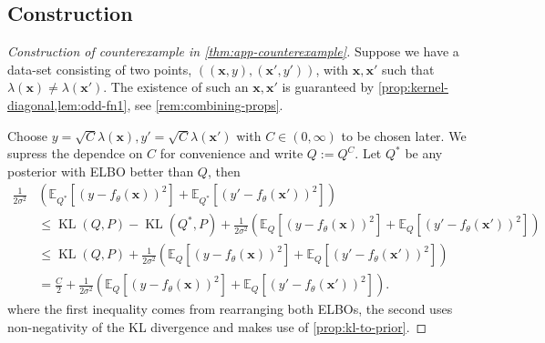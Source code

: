 \documentclass[twoside]{article}
\newcommand{\vx}{\mathbf{x}}
\newcommand{\E}{\mathbb{E}}
\renewcommand{\P}{\mathbb{P}}
\newcommand{\Q}{\mathbb{Q}}
\renewcommand{\Q}{\ensuremath{Q}}
\renewcommand{\P}{\ensuremath{P}}
\newcommand{\KL}{\operatorname{KL}}
\theoremstyle{theoremstyle}
\begin{document}
\subsection{Construction}

\begin{proof}[Construction of counterexample in \cref{thm:app-counterexample}]
Suppose we have a data-set consisting of two points, $((\vx,y), (\vx',y'))$, with $\vx, \vx'$ such that $\lambda(\vx) \neq \lambda(\vx')$. The existence of such an $\vx, \vx'$ is guaranteed by \cref{prop:kernel-diagonal,lem:odd-fn1}, see \cref{rem:combining-props}.

Choose $y=\sqrt{C}\lambda(\vx),y'=\sqrt{C}\lambda(\vx')$ with $C\in (0,\infty)$ to be chosen later. We supress the dependce on $C$ for convenience and write $\Q:=\Q^{C}$. Let $\Q^*$ be any posterior with ELBO better than $\Q$, then
\begin{align}
    \frac{1}{2\sigma^2}&\left(\E_{\Q^*}[(y-f_{\theta}(\vx))^2]+\E_{\Q^*}[(y'-f_{\theta}(\vx'))^2]\right) \\ 
    &\leq \KL(\Q,\P)-  \KL(\Q^*,\P) +     \frac{1}{2\sigma^2}\left(\E_{\Q}[(y-f_{\theta}(\vx))^2]+\E_{\Q}[(y'-f_{\theta}(\vx'))^2]\right) \\
    & \leq \KL(\Q,\P) +     \frac{1}{2\sigma^2}\left(\E_{\Q}[(y-f_{\theta}(\vx))^2]+\E_{\Q}[(y'-f_{\theta}(\vx'))^2]\right) \\
    & = \frac{C}{2} + \frac{1}{2\sigma^2}\left(\E_{\Q}[(y-f_{\theta}(\vx))^2]+\E_{\Q}[(y'-f_{\theta}(\vx'))^2]\right).
\end{align}
where the first inequality comes from rearranging both ELBOs, the second uses non-negativity of the KL divergence and makes use of \cref{prop:kl-to-prior}. 


\end{proof}
\end{document}
